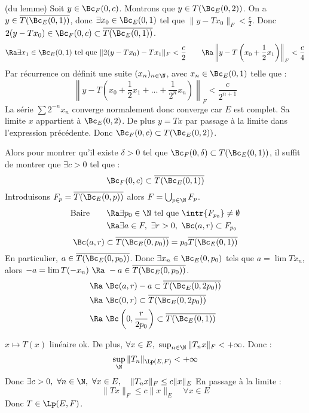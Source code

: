 \prv (du lemme)\dl
Soit $y\in \Bc_F(0,c)$. Montrons que $y\in T(\Bc_E(0,2))$. On a $y\in\overline{T(\Bc_E(0,1))}$, donc $\exists x_0\in\Bc_E(0,1)$ tel que $\|y-Tx_0\|_F<\frac c 2$. Donc $2(y-Tx_0)\in\Bc_F(0,c)\subset\overline{T(\Bc_E(0,1))}$.
$$\Ra\exists x_1\in\Bc_E(0,1)\text{ tel que }\|2(y-Tx_0)-Tx_1\|_F<\frac c 2\quad\quad\Ra\left\| y-T\left(x_0+\frac 1 2 x_1\right)\right\|_F<\frac c 4$$
Par récurrence on définit une suite $(x_n)_{n\in\N}$, avec $x_n\in\Bc_E(0,1)$ telle que :
$$\left\|y-T\left(x_0+\frac 1 2 x_1+...+\frac{1}{2^n}x_n\right)\right\|_F<\frac{c}{2^{n+1}}$$
La série $\sum 2^{-n}x_n$ converge normalement donc converge car $E$ est complet. Sa limite $x$ appartient à $\Bc_E(0,2)$. De plus $y=Tx$ par passage à la limite dans l'expression précédente. 
\dl Donc $\Bc_F(0,c)\subset T(\Bc_E(0,2))$.
\prvf

\dd Alors pour montrer qu'il existe $\delta>0$ tel que $\Bc_F(0,\delta)\subset T(\Bc_E(0,1))$, il suffit de montrer que $\exists c>0$ tel que :
$$\Bc_F(0,c)\subset \overline{T(\Bc_E(0,1))}$$
Introduisons $F_p=\overline{T(\Bc_E(0,p))}$ alors $F=\bigcup_{p\in\N} F_p$.
\begin{align*}
  \text{Baire}\quad&\quad\Ra\exists p_0\in\N\text{ tel que }\intr{F_{p_0}}\neq\emptyset\\
  &\quad\Ra\exists a\in F,\ \exists r>0,\ \Bc(a,r)\subset F_{p_0}
\end{align*}
$$\Bc(a,r)\subset\overline{T(\Bc_E(0,p_0))}=p_0\overline{T(\Bc_E(0,1))}$$
En particulier, $a\in\overline{T(\Bc_E(0,p_0))}$. Donc $\exists x_n\in \Bc_E(0,p_0)$ tels que $a=\lim Tx_n$, alors $-a=\lim T(-x_n)\ \Ra\ -a\in\overline{T(\Bc_E(0,p_0))}$.
\begin{align*}
  &\Ra\ \Bc(a,r)-a\subset\overline{T(\Bc_E(0,2p_0))}\\
  &\Ra\ \Bc(0,r)\subset\overline{T(\Bc_E(0,2p_0))}\\
  &\Ra\ \Bc\left(0,\frac{r}{2p_0}\right)\subset \overline{T(\Bc_E(0,1))}
\end{align*}
\prvf

\prvv
$x\mapsto T(x)$ linéaire ok. De plus, $\forall x\in E,\ \sup_{n\in\N}\|T_nx\|_F<+\infty$. Donc :
$$\sup_\N\|T_n\|_{\Lp(E,F)}<+\infty$$
Donc $\exists c>0,\ \forall n\in\N,\ \forall x\in E,\quad \|T_n x\|_F\le c\|x\|_E$
En passage à la limite :
$$\|Tx\|_F\le c\|x\|_E\quad\forall x\in E$$
Donc $T\in\Lp(E,F)$.
\prvf

